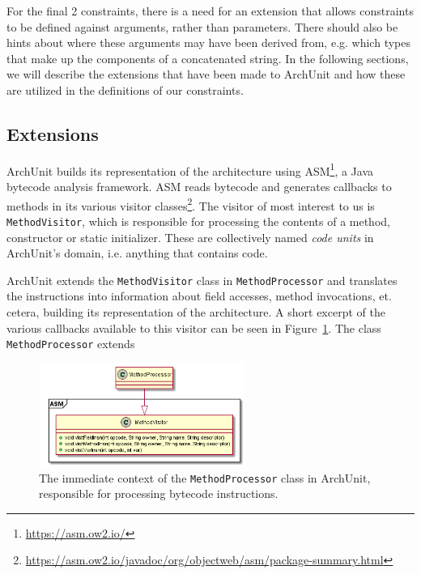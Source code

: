 For the final 2 constraints, there is a need for an extension that allows constraints to be defined against arguments, rather than parameters. There should also be hints about where these arguments may have been derived from, e.g. which types that make up the components of a concatenated string. In the following sections, we will describe the extensions that have been made to ArchUnit and how these are utilized in the definitions of our constraints.

\subsection{Extensions}

ArchUnit builds its representation of the architecture using ASM\footnote{\url{https://asm.ow2.io/}}, a Java bytecode analysis framework. ASM reads bytecode and generates callbacks to methods in its various visitor classes\footnote{\url{https://asm.ow2.io/javadoc/org/objectweb/asm/package-summary.html}}. The visitor of most interest to us is \texttt{MethodVisitor}, which is responsible for processing the contents of a method, constructor or static initializer. These are collectively named \textit{code units} in ArchUnit's domain, i.e. anything that contains code. 

ArchUnit extends the \texttt{MethodVisitor} class in \texttt{MethodProcessor} and translates the instructions into information about field accesses, method invocations, et. cetera, building its representation of the architecture. A short excerpt of the various callbacks available to this visitor can be seen in Figure~\ref{fig:method_processor_1}. The class \texttt{MethodProcessor} extends

\begin{figure}
    \centering
    \includegraphics[width=0.6\textwidth]{figure/extension/MethodProcessor1.png}
    \caption{The immediate context of the \texttt{MethodProcessor} class in ArchUnit, responsible for processing bytecode instructions.}
    \label{fig:method_processor_1}
\end{figure}


